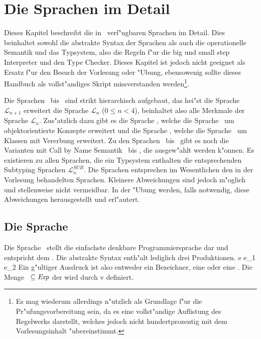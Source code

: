 
\chapter{Die Sprachen im Detail\label{DieSprachenImDetail}}

Dieses Kapitel beschreibt die in \TPML\ verf"ugbaren Sprachen im Detail. Dies beinhaltet sowohl die abstrakte Syntax der Sprachen als auch die
operationelle Semantik und das Typsystem, also die Regeln f"ur die big und small step Interpreter und den Type Checker. Dieses Kapitel ist
jedoch nicht geeignet als Ersatz f"ur den Besuch der Vorlesung oder "Ubung, ebensowenig sollte dieses Handbuch als vollst"andiges Skript
missverstanden werden\footnote{Es mag wiederum allerdings n"utzlich als Grundlage f"ur die Pr"ufungsvorbereitung sein, da es eine vollst"andige
Auflistung des Regelwerks darstellt, welches jedoch nicht hundertprozentig mit dem Vorlesungsinhalt "ubereinstimmt.}.

Die Sprachen \LZERO\ bis \LFOUR\ sind strikt hierarchisch aufgebaut, das hei"st die Sprache $\mathcal{L}_{n+1}$ erweitert die Sprache
$\mathcal{L}_n$ ($0 \le n < 4$), beinhaltet also alle Merkmale der Sprache $\mathcal{L}_n$.
Zus"atzlich dazu gibt es die Sprache \LTWOO, welche die Sprache \LTWO\ um objektorientierte Konzepte erweitert
und die Sprache \LTWOC, welche die Sprache \LTWOO\ um Klassen mit Vererbung erweitert.
Zu den Sprachen \LZERO\ bis \LTWO\ gibt es noch die Varianten mit Call by Name Semantik \LZEROCBN\ bis \LTWOCBN,
die ausgew"ahlt werden k"onnen.
Es existieren zu allen Sprachen, die ein Typsystem enthalten die entsprechenden Subtyping Sprachen
$\mathcal{L}_n^{SUB}$.
Die Sprachen entsprechen im Wesentlichen
den in der Vorlesung behandelten Sprachen. Kleinere Abweichungen sind jedoch m"oglich und stellenweise nicht vermeidbar. In der "Ubung
werden, falls notwendig, diese Abweichungen herausgestellt und erl"autert.



\section{Die Sprache \LZERO}

Die Sprache \LZERO\ stellt die einfachste denkbare Programmiersprache dar und entspricht dem  . Die abstrakte Syntax enth"alt lediglich drei Produktionen.
\bgram
e \is \id
  \al {}
  \al e_1\,e_2
\egram
Ein g"ultiger Ausdruck ist also entweder ein Bezeichner, eine  oder eine .
Die Menge \notation{$\Val$}\ $\subseteq {\text{\it Exp\/}}$ der    wird durch
\bgram
v \is \id
  \al {}
\egram
definiert.


